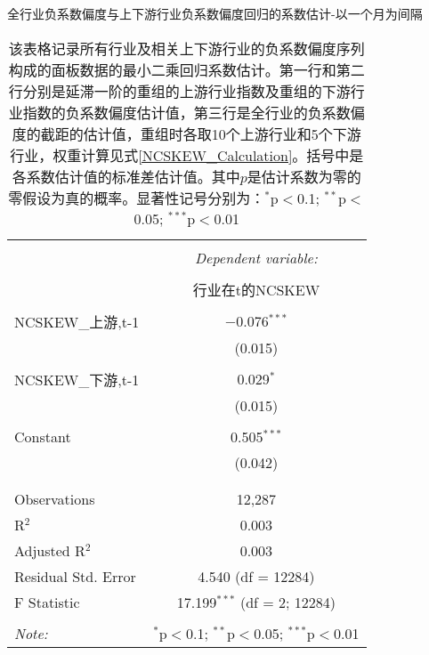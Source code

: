 \documentclass{sysuthesis}
\begin{document}
\begin{table}[!htbp] \centering 
\caption{全行业负系数偏度与上下游行业负系数偏度回归的系数估计-以一个月为间隔} 
  \caption*{\footnotesize 该表格记录所有行业及相关上下游行业的负系数偏度序列构成的面板数据的最小二乘回归系数估计。第一行和第二行分别是延滞一阶的重组的上游行业指数及重组的下游行业指数的负系数偏度估计值，第三行是全行业的负系数偏度的截距的估计值，重组时各取10个上游行业和5个下游行业，权重计算见式\ref{NCSKEW_Calculation}。括号中是各系数估计值的标准差估计值。其中$p$是估计系数为零的零假设为真的概率。显著性记号分别为：{$^{*}$p$<$0.1; $^{**}$p$<$0.05; $^{***}$p$<$0.01}} 
  \renewcommand{\arraystretch}{0.5}
\begin{tabular}{@{\extracolsep{5pt}}lc} 
\\[-1.8ex]\hline 
\hline \\[-1.8ex] 
 & \multicolumn{1}{c}{\textit{Dependent variable:}} \\ 
\cline{2-2} 
\\[-1.8ex] & 行业在t的NCSKEW \\ 
\hline \\[-1.8ex] 
 NCSKEW\_{上游,t-1} & $-$0.076$^{***}$ \\ 
  & (0.015) \\ 
  & \\ 
 NCSKEW\_{下游,t-1} & 0.029$^{*}$ \\ 
  & (0.015) \\ 
  & \\ 
 Constant & 0.505$^{***}$ \\ 
  & (0.042) \\ 
  & \\ 
\hline \\[-1.8ex] 
Observations & 12,287 \\ 
R$^{2}$ & 0.003 \\ 
Adjusted R$^{2}$ & 0.003 \\ 
Residual Std. Error & 4.540 (df = 12284) \\ 
F Statistic & 17.199$^{***}$ (df = 2; 12284) \\ 
\hline 
\hline \\[-1.8ex] 
\textit{Note:}  & \multicolumn{1}{r}{$^{*}$p$<$0.1; $^{**}$p$<$0.05; $^{***}$p$<$0.01} \\ 
\end{tabular} 
\end{table} 
\end{document}
